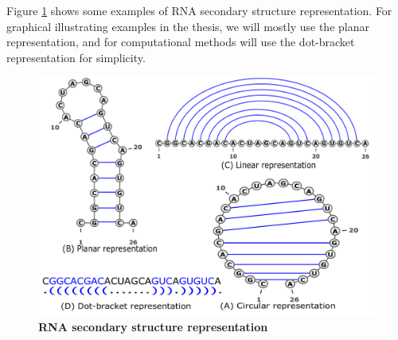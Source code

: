 Figure \ref{fig:representation} shows some examples of RNA secondary structure representation. For graphical illustrating examples in the thesis, we will mostly use the planar representation, and for computational methods will use the dot-bracket representation for simplicity.  
\begin{figure}
	\includegraphics[width=1. \linewidth]{../res/images/arnaque/rep.pdf}
	\caption{\textbf{RNA secondary structure representation}}\label{fig:representation}
\end{figure}


